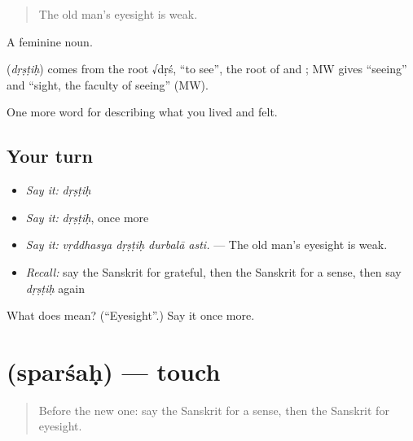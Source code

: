 \begin{quote}
The old man's eyesight is weak.
\end{quote}

A feminine noun.

\begin{cousinweb}
\textbf{} (\emph{dṛṣṭiḥ}) comes from the root √dṛś, \textquotedblleft{}to see\textquotedblright{}, the root of \textbf{} and \textbf{}; MW gives \textquotedblleft{}seeing\textquotedblright{} and \textquotedblleft{}sight, the faculty of seeing\textquotedblright{} (MW).
\end{cousinweb}

\begin{grammarlens}[title={What you've built}]
One more word for describing what you lived and felt.
\end{grammarlens}

\subsection*{Your turn}
\begin{itemize}
\raggedright
  \item \emph{Say it:} \emph{dṛṣṭiḥ}
  \item \emph{Say it:} \emph{dṛṣṭiḥ}, once more
  \item \emph{Say it:} \emph{vṛddhasya dṛṣṭiḥ durbalā asti.} — The old man's eyesight is weak.
  \item \emph{Recall:} say the Sanskrit for grateful, then the Sanskrit for a sense, then say \emph{dṛṣṭiḥ} again
\end{itemize}

\begin{tcolorbox}[breakable,colback=teal!4,colframe=teal!35!black,title={Before you move on}]
What does  mean? (\textquotedblleft{}Eyesight\textquotedblright{}.) Say it once more.
\end{tcolorbox}
\section[\texorpdfstring{\sk{स्पर्शः} (sparśaḥ)}{स्पर्शः (sparśaḥ)}]{ (sparśaḥ) — touch}

\label{lesson:SA-C469-sparsah}



\begin{quote}
Before the new one: say the Sanskrit for a sense, then the Sanskrit for eyesight.
\end{quote}


